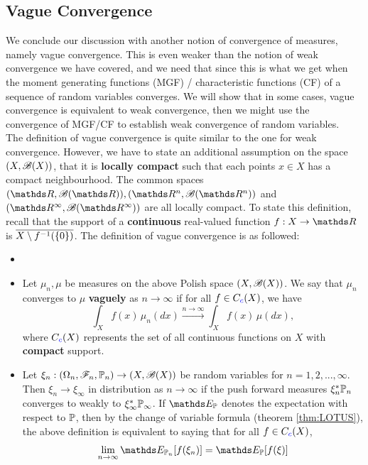 \subsection{Vague Convergence}
\begin{unexaminable}
We conclude our discussion with another notion of convergence of measures, namely vague convergence. This is even weaker than the notion of weak convergence we have covered, and we need that since this is what we get when the moment generating functions (MGF) / characteristic functions (CF) of a sequence of random variables converges. We will show that in some cases, vague convergence is equivalent to weak convergence, then we might use the convergence of MGF/CF to establish weak convergence of random variables.\\

The definition of vague convergence is quite similar to the one for weak convergence. However, we have to state an additional assumption on the space $(X,\mathcal{B}(X))$, that it is \textbf{locally compact} such that each points $x \in X$ has a compact neighbourhood. The common spaces $(\R,\B(\R)), (\R^n, \B(\R^n))$ and $(\R^\infty, \B(\R^\infty))$ are all locally compact. To state this definition, recall that the support of a \textbf{continuous} real-valued function $f:X \to \R$ is $\overline{X \setminus f^{-1}(\left\{ 0 \right \})}$. The definition of vague convergence is as followed:

\begin{definition} 
\begin{itemize}
\item[]
\item Let $\mu_n, \mu$ be measures on the above Polish space $(X,\mathcal{B}(X))$. We say that $\mu_n$ converges to $\mu$ \textbf{vaguely} as $n \to \infty$ if for all $f \in C_{\textcolor{blue}{c}}(X)$, we have
\begin{equation*}
    \int_X f(x) \, \mu_n(dx) \overset{n \to \infty}{\to} \int_X f(x) \, \mu(dx),
\end{equation*}
where $C_{\textcolor{blue}{c}}(X)$ represents the set of all continuous functions on $X$ with \textbf{compact} support.
\item Let $\xi_n : (\Omega_n, \mathcal{F}_n, \mathbb{P}_n) \to (X,\mathcal{B}(X))$ be random variables for $n = 1,2,...,\infty$. Then $\xi_n \to \xi_\infty$ in distribution as $n \to \infty$ if the push forward measures $\xi_n^* \mathbb{P}_n$ converges to weakly to $\xi_\infty^*\mathbb{P}_\infty$. If $\E_\p$ denotes the expectation with respect to $\mathbb{P}$, then by the change of variable formula (theorem \ref{thm:LOTUS}), the above definition is equivalent to saying that for all $f \in C_{\textcolor{blue}{c}}(X)$,
\begin{equation*}
    \lim_{n\to\infty} \E_{\p_n}[f(\xi_n)] = \E_{\p}[f(\xi)]
\end{equation*}
\end{itemize}
\end{definition}


\end{unexaminable}

